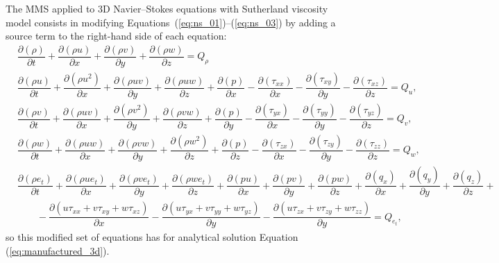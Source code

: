\documentclass[10pt]{article}
\newcommand{\Diff}[2] {\dfrac{\partial( #1)}{\partial #2}}
\begin{document}
The MMS applied to 3D Navier--Stokes equations  with Sutherland viscosity model consists in modifying Equations~(\ref{eq:ns_01})--(\ref{eq:ns_03}) by adding a source term to the right-hand side of each equation:
\begin{equation}
\begin{split}
\label{eq:ns_3d_mod}
&\Diff{\rho}{t} +\Diff{\rho u}{x}+\Diff{\rho v}{y} + \Diff{\rho w}{z} = Q_\rho\\
%
 &\Diff{\rho u}{t} +\Diff{\rho u^2 }{x}+\Diff{\rho uv}{y} +\Diff{\rho uw}{z} +\Diff{p}{x}-\Diff{\tau_{xx}}{x}-\Diff{\tau_{xy}}{y}-\Diff{\tau_{xz}}{z}= Q_u,\\
%
&\Diff{\rho v}{t} +\Diff{\rho uv }{x}+\Diff{\rho v^2}{y} +\Diff{\rho vw}{z}+\Diff{p}{y}-\Diff{\tau_{yx}}{x}-\Diff{\tau_{yy}}{y}-\Diff{\tau_{yz}}{z}= Q_v,\\
%
&\Diff{\rho w}{t} +\Diff{\rho  uw }{ x}+\Diff{\rho  vw }{ y}+\Diff{\rho w^2 }{ z}+\Diff{p}{z}-\Diff{\tau_{zx}}{x}-\Diff{\tau_{zy}}{y}-\Diff{\tau_{zz}}{z}=Q_w,\\
%
&\Diff{\rho e_t}{t} +\Diff{\rho u e_t}{x}+\Diff{\rho v e_t}{y}+\Diff{\rho we_t}{z}+\Diff{pu}{x}+\Diff{pv}{y}+\Diff{pw}{z} +\Diff{q_x}{x} +\Diff{q_y}{y} +\Diff{q_z}{z}+\\
    &\qquad-\Diff{u\tau_{xx}+v\tau_{xy}+w\tau_{xz}}{x}-\Diff{u\tau_{yx}+v\tau_{yy}+w\tau_{yz}}{y}-\Diff{u\tau_{zx}+v\tau_{zy}+w\tau_{zz}}{y}=Q_{e_t},
\end{split}
\end{equation}
so this modified set of equations has for analytical solution Equation (\ref{eq:manufactured_3d}).
\end{document}
